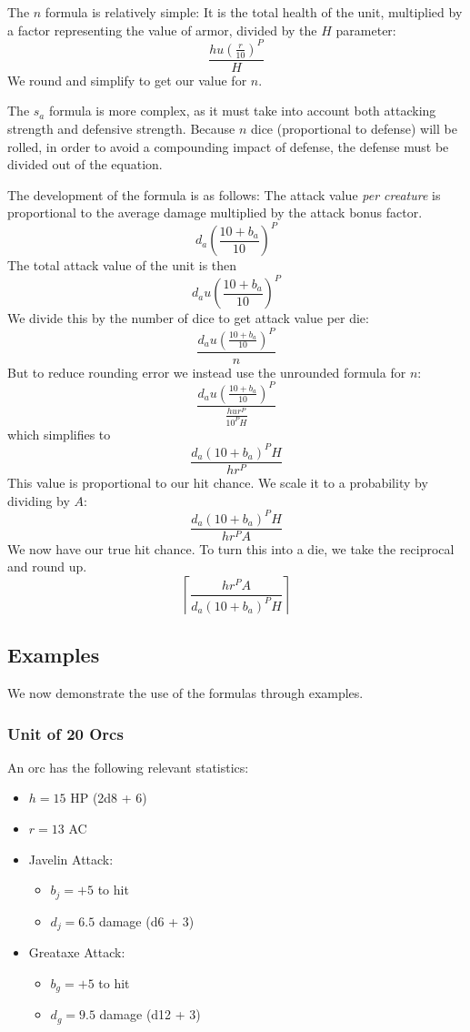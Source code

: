 \documentclass[twocolumn]{article}
\begin{document}
The $n$ formula is relatively simple:
It is the total health of the unit,
multiplied by a factor representing the value of armor,
divided by the $H$ parameter:
\[
    \frac
        {h u (\frac{r}{10})^P}
        {H}
\]
We round and simplify to get our value for $n$.

The $s_a$ formula is more complex,
as it must take into account both attacking strength and defensive strength.
Because $n$ dice (proportional to defense) will be rolled,
in order to avoid a compounding impact of defense,
the defense must be divided out of the equation.

The development of the formula is as follows:
The attack value \emph{per creature} is proportional to
the average damage multiplied by the attack bonus factor.
\[
    d_a \left(\frac{10 + b_{a}}{10}\right)^{P}
\]
The total attack value of the unit is then 
\[
    d_a u \left(\frac{10 + b_{a}}{10}\right)^{P}
\]
We divide this by the number of dice to get attack value per die: 
\[
    \frac
        {d_a u \left(\frac{10 + b_{a}}{10}\right)^{P}}
        {n}
\]
But to reduce rounding error we instead use the unrounded formula for $n$: 
\[
    \frac
        {d_a u \left(\frac{10 + b_{a}}{10}\right)^{P}}
        {\frac{h u r^P}{10^P H}}
\]
which simplifies to 
\[
    \frac
        {d_a (10 + b_{a})^P H}
        {h r^P}
\]
This value is proportional to our hit chance.
We scale it to a probability by dividing by $A$:
\[
    \frac
        {d_a (10 + b_{a})^P H}
        {h r^P A}
\]
We now have our true hit chance.
To turn this into a die, we take the reciprocal and round up.
\[
    \left\lceil
        \frac
            {h r^P A}
            {d_a (10 + b_{a})^P H}
    \right\rceil
\]

\subsection{Examples}

We now demonstrate the use of the formulas through examples.

\subsubsection{Unit of 20 Orcs}

An orc has the following relevant statistics:
\begin{itemize}
    \item $h = 15$ HP (2d8 + 6)
    \item $r = 13$ AC
    \item Javelin Attack:
        \begin{itemize}
            \item $b_j = +5$ to hit
            \item $d_j = 6.5$ damage (d6 + 3)
        \end{itemize}
    \item Greataxe Attack:
        \begin{itemize}
            \item $b_g = +5$ to hit
            \item $d_g = 9.5$ damage (d12 + 3)
        \end{itemize}
\end{itemize}
\end{document}
